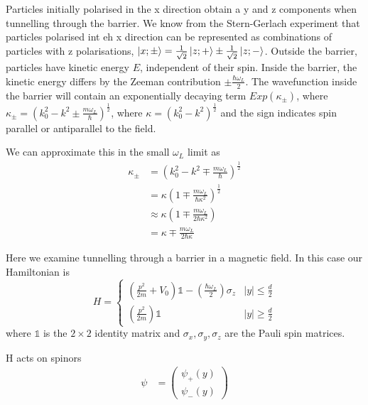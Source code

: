 \documentclass{article}
\begin{document}
Particles initially polarised in the x direction obtain a y and z components when tunnelling through the barrier. We know from the Stern-Gerlach experiment that particles polarised int eh x direction can be represented as combinations of particles with z polarisations, $\ket{x; \pm} = \frac{1}{\sqrt{2}}\ket{z;+} \pm \frac{1}{\sqrt{2}}\ket{z;-}$. Outside the barrier, particles have kinetic energy $E$, independent of their spin. Inside the barrier, the kinetic energy differs by the Zeeman contribution $\pm \frac{\hbar \omega_{L}}{2}$. The wavefunction inside the barrier will contain an exponentially decaying term $Exp(\kappa_{\pm})$, where $\kappa_{\pm} = (k^{2}_{0}-k^{2} \pm \frac{m \omega_L}{\hbar})^{\frac{1}{2}}$, where $\kappa = (k_{0}^2-k^2)^{\frac{1}{2}}$ and the sign indicates spin parallel or antiparallel to the field.  

We can approximate this in the small $\omega_L$ limit as
	\begin{align*}
		\kappa_{\pm} &= \left(k^{2}_{0}-k^{2} \mp \frac{m \omega_{L}}{\hbar}\right)^{\frac{1}{2}}\\	
			     &= \kappa \left(1 \mp \frac{m \omega_{L}}{\hbar \kappa^{2}}\right)^{\frac{1}{2}}\\
			     &\approx \kappa \left(1 \mp \frac{m \omega_{L}}{2\hbar \kappa^{2}}\right)\\
			      &= \kappa \mp \frac{m \omega_{L}}{2\hbar \kappa}
	\end{align*}

Here we examine tunnelling through a barrier in a magnetic field. In this case our Hamiltonian is
\begin{equation}
	H = 
	\begin{cases}
	\left(\frac{p^2}{2m} + V_0\right)\mathbb{1}-\left(\frac{\hbar \omega_L}{2}\right) \sigma_z & |y| \leq \frac{d}{2}\\
	\left(\frac{p^2}{2m}\right)\mathbb{1} & |y| \geq \frac{d}{2}
	\end{cases}
	\end{equation}
where $\mathbb{1}$ is the $2 \times 2$ identity matrix and $\sigma_{x}, \sigma_{y}, \sigma_{z}$ are the Pauli spin matrices.

H acts on spinors
\begin{align}
	\psi &= \begin{pmatrix}
		\psi_{+}(y) \\
		\psi_{-}(y)
		\end{pmatrix}
\end{align}
\end{document}
